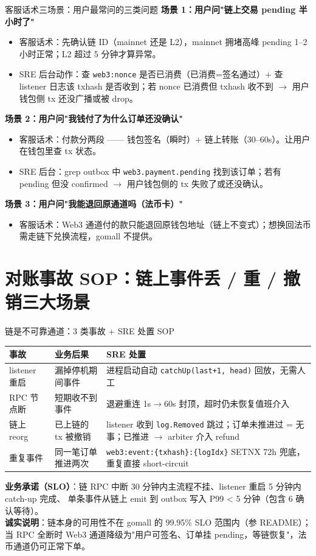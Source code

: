 \documentclass[aspectratio=169,11pt]{beamer}
\begin{document}
\begin{frame}[shrink]{客服话术三场景：用户最常问的三类问题}
\textbf{场景 1：用户问"链上交易 pending 半小时了"}
\begin{itemize}
  \item 客服话术：先确认链 ID（mainnet 还是 L2），mainnet 拥堵高峰 pending 1--2 小时正常；L2 超过 5 分钟才算异常。
  \item SRE 后台动作：查 \texttt{web3:nonce} 是否已消费（已消费=签名通过）+ 查 listener 日志该 txhash 是否收到；若 nonce 已消费但 txhash 收不到 $\to$ 用户钱包侧 tx 还没广播或被 drop。
\end{itemize}
\textbf{场景 2：用户问"我钱付了为什么订单还没确认"}
\begin{itemize}
  \item 客服话术：付款分两段 —— 钱包签名（瞬时）+ 链上转账（30--60s）。让用户在钱包里查 tx 状态。
  \item SRE 后台：grep outbox 中 \texttt{web3.payment.pending} 找到该订单；若有 pending 但没 confirmed $\to$ 用户钱包侧的 tx 失败了或还没确认。
\end{itemize}
\textbf{场景 3：用户问"我能退回原通道吗（法币卡）"}
\begin{itemize}
  \item 客服话术：Web3 通道付的款只能退回原钱包地址（链上不变式）；想换回法币需走链下兑换流程，gomall 不提供。
\end{itemize}
\end{frame}

\section{对账事故 SOP：链上事件丢 / 重 / 撤销三大场景}

\begin{frame}[shrink]{链是不可靠通道：3 类事故 + SRE 处置 SOP}
\begin{tabular}{@{}llp{4.2cm}@{}}
\toprule
事故 & 业务后果 & SRE 处置 \\
\midrule
listener 重启 & 漏掉停机期间事件 & 进程启动自动 \texttt{catchUp(last+1, head)} 回放，无需人工 \\
RPC 节点断 & 短期收不到事件   & 退避重连 1s$\to$60s 封顶，超时仍未恢复值班介入 \\
链上 reorg & 已上链的 tx 被撤销 & listener 收到 \texttt{log.Removed} 跳过；订单未推进过 = 无事；已推进 $\to$ arbiter 介入 refund \\
重复事件 & 同一笔订单推进两次 & \texttt{web3:event:\{txhash\}:\{logIdx\}} SETNX 72h 兜底，重复直接 short-circuit \\
\bottomrule
\end{tabular}
\vspace{2mm}
\small \textbf{业务承诺（SLO）}：链 RPC 中断 30 分钟内主流程不挂、listener 重启 5 分钟内 catch-up 完成、
单条事件从链上 emit 到 outbox 写入 P99 < 5 分钟（包含 6 确认等待）。\\
\textbf{诚实说明}：链本身的可用性不在 gomall 的 99.95\% SLO 范围内（参 README）；当 RPC 全断时
Web3 通道降级为"用户可签名、订单挂 pending，等链恢复"，法币通道仍可正常下单。
\end{frame}
\end{document}
